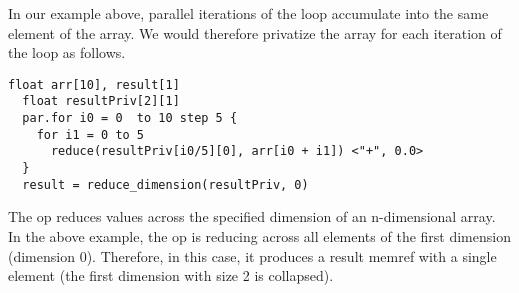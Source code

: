 In our example above, parallel iterations of the  loop accumulate 
into the same element of the  array.
We would therefore privatize the  array for each iteration of 
the  loop as follows. 
\begin{lstlisting}[style=c++]
  float arr[10], result[1]
  float resultPriv[2][1]
  par.for i0 = 0  to 10 step 5 {
    for i1 = 0 to 5 
      reduce(resultPriv[i0/5][0], arr[i0 + i1]) <"+", 0.0>
  }
  result = reduce_dimension(resultPriv, 0)
\end{lstlisting}

The op  reduces values across the specified
dimension of an n-dimensional array. In the above example, 
the  op is reducing across all elements 
of the first dimension (dimension 0). Therefore, in this case, it 
produces a result memref with a single element (the first dimension
with size 2 is collapsed). 






